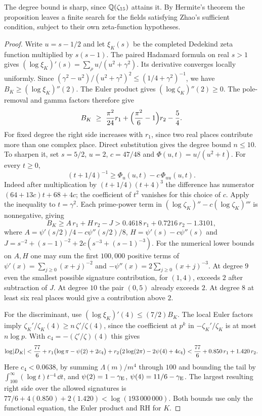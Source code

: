 The degree bound is sharp, since $\mathbb{Q}(\zeta_{15})$ attains it. By Hermite's theorem the
proposition leaves a finite search for the fields satisfying Zhao's sufficient condition,
subject to their own zeta-function hypotheses.

\begin{proof}
Write $u=s-1/2$ and let $\xi_K(s)$ be the completed Dedekind zeta function multiplied by
$s(s-1)$. The paired Hadamard formula on real $s>1$ gives
$(\log\xi_K)'(s)=\sum_\rho u/(u^2+\gamma^2)$. Its derivative converges locally uniformly.
Since $(\gamma^2-u^2)/(u^2+\gamma^2)^2\le(1/4+\gamma^2)^{-1}$, we have
$B_K\ge(\log\xi_K)''(2)$. The Euler product gives $(\log\zeta_K)''(2)\ge0$. The
pole-removal and gamma factors therefore give
\[
 B_K\ \ge\ \frac{\pi^2}{24}r_1+\Bigl(\frac{\pi^2}6-1\Bigr)r_2-\frac54 .
\]
For fixed degree the right side increases with $r_1$, since two real places contribute
more than one complex place. Direct substitution gives the degree bound $n\le10$. To
sharpen it, set $s=5/2$, $u=2$, $c=47/48$ and $\Phi(u,t)=u/(u^2+t)$. For every $t\ge0$,
\[
 (t+1/4)^{-1}\ge\Phi_u(u,t)-c\,\Phi_{uu}(u,t).
\]
Indeed after multiplication by $(t+1/4)(t+4)^3$ the difference has numerator
$(64+13c)t+68+4c$; the coefficient of $t^2$ vanishes for this choice of $c$. Apply the
inequality to $t=\gamma^2$. Each prime-power term in
$(\log\zeta_K)''-c(\log\zeta_K)'''$ is nonnegative, giving
\[
 B_K\ge A\,r_1+H\,r_2-J>0.4618\,r_1+0.7216\,r_2-1.3101 ,
\]
where $A=\psi'(s/2)/4-c\psi''(s/2)/8$, $H=\psi'(s)-c\psi''(s)$ and
$J=s^{-2}+(s-1)^{-2}+2c(s^{-3}+(s-1)^{-3})$. For the numerical lower bounds on $A,H$ one
may sum the first $100{,}000$ positive terms of $\psi'(x)=\sum_{j\ge0}(x+j)^{-2}$ and
$-\psi''(x)=2\sum_{j\ge0}(x+j)^{-3}$. At degree $9$ even the smallest possible signature
contribution, for $(1,4)$, exceeds $2$ after subtraction of $J$. At degree $10$ the pair
$(0,5)$ already exceeds $2$. At degree $8$ at least six real places would give a
contribution above $2$.

For the discriminant, use $(\log\xi_K)'(4)\le(7/2)B_K$. The local Euler factors imply
$\zeta_K'/\zeta_K(4)\ge n\,\zeta'/\zeta(4)$, since the coefficient at $p^k$ in
$-\zeta_K'/\zeta_K$ is at most $n\log p$. With $c_4=-(\zeta'/\zeta)(4)$ this gives
\[
 \log\lvert D_K\rvert<\frac{77}6+r_1\bigl(\log\pi-\psi(2)+2c_4\bigr)
 +r_2\bigl(2\log(2\pi)-2\psi(4)+4c_4\bigr)<\frac{77}6+0.850\,r_1+1.420\,r_2 .
\]
Here $c_4<0.0638$, by summing $\Lambda(m)/m^4$ through $100$ and bounding the tail by
$\int_{100}^\infty(\log t)t^{-4}\,\dd t$, and $\psi(2)=1-\gamma_{\mathrm{E}}$,
$\psi(4)=11/6-\gamma_{\mathrm{E}}$. The largest resulting right side over the allowed signatures is
$77/6+4(0.850)+2(1.420)<\log(193\,000\,000)$. Both bounds use only the functional equation,
the Euler product and RH for $K$.
\end{proof}

